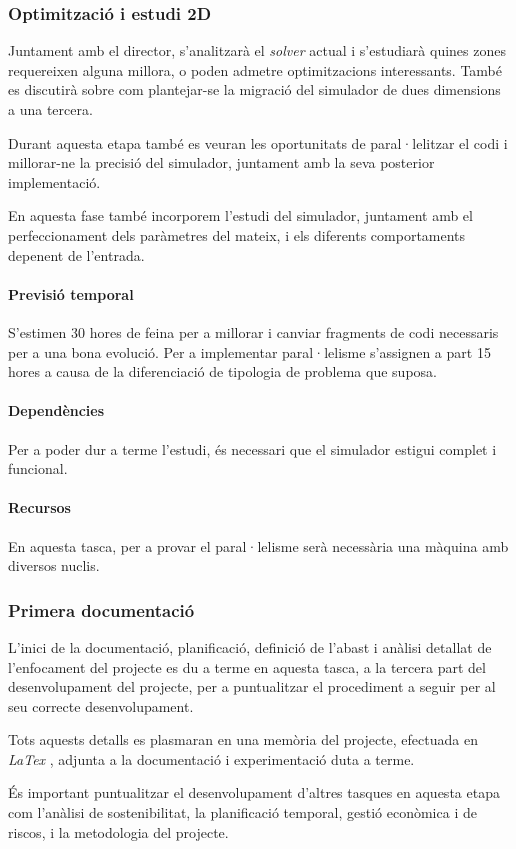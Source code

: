 \documentclass[a4paper]{report}
\begin{document}
	\subsubsection{Optimització i estudi 2D}
	Juntament amb el director, s'analitzarà el \textit{solver} actual i s'estudiarà quines zones requereixen alguna millora, o poden admetre optimitzacions interessants. També es discutirà sobre com plantejar-se la migració del simulador de dues dimensions a una tercera. \par
	Durant aquesta etapa també es veuran les oportunitats de paral·lelitzar el codi i millorar-ne la precisió del simulador, juntament amb la seva posterior implementació.\par
	En aquesta fase també incorporem l'estudi del simulador, juntament amb el perfeccionament dels paràmetres del mateix, i els diferents comportaments depenent de l'entrada.
	\paragraph{\quad Previsió temporal} S'estimen 30 hores de feina per a millorar i canviar fragments de codi necessaris per a una bona evolució. Per a implementar paral·lelisme s'assignen a part 15 hores a causa de la diferenciació de tipologia de problema que suposa.
	\paragraph{\quad Dependències} Per a poder dur a terme l'estudi, és necessari que el simulador estigui complet i funcional.
	\paragraph{\quad Recursos} En aquesta tasca, per a provar el paral·lelisme serà necessària una màquina amb diversos nuclis.
	
	\subsubsection{Primera documentació}
	L'inici de la documentació, planificació, definició de l'abast i anàlisi detallat de l'enfocament del projecte es du a terme en aquesta tasca, a la tercera part del desenvolupament del projecte, per a puntualitzar el procediment a seguir per al seu correcte desenvolupament. \par
	Tots aquests detalls es plasmaran en una memòria del projecte, efectuada en \textit{LaTex} \cite{latex}, adjunta a la documentació i experimentació duta a terme.\par
	És important puntualitzar el desenvolupament d'altres tasques en aquesta etapa com l'anàlisi de sostenibilitat, la planificació temporal, gestió econòmica i de riscos, i la metodologia del projecte.
\end{document}
